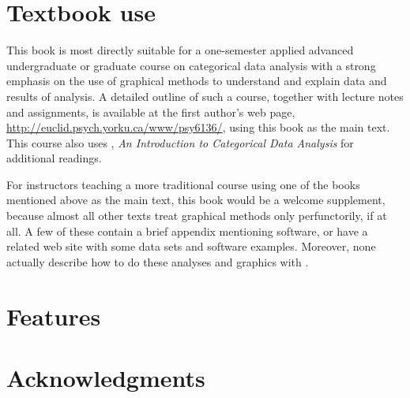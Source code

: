 \section*{Textbook use}
This book is most directly suitable for a one-semester applied 
advanced undergraduate or graduate
course on categorical data analysis with a strong emphasis
on the use of graphical methods to understand and explain data and
results of analysis.
A detailed outline of such a course, together with lecture notes
and assignments,
is available at the first author's
web page, \url{http://euclid.psych.yorku.ca/www/psy6136/}, using this
book as the main text.  This course also uses 
\citet{Agresti:2007:ICDA}, \emph{An Introduction to Categorical Data Analysis}
for additional readings.

For instructors teaching a more traditional course using one of the books
mentioned above as the main text, this book would be a welcome supplement,
because almost all other texts treat graphical methods only perfunctorily,
if at all.
A few of these contain a brief appendix mentioning software, or have
a related web site with some data sets and software examples.
Moreover, none actually describe how to do these analyses and graphics with \R.

\section*{Features}


\section*{Acknowledgments}


